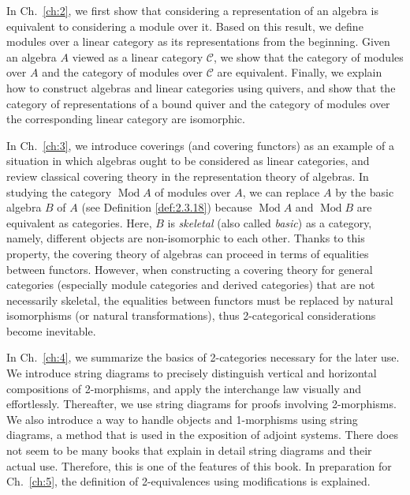 \documentclass{surv-l}
\numberwithin{equation}{chapter}
\numberwithin{figure}{chapter}
\theoremstyle{plain}
\theoremstyle{definition}
\theoremstyle{remark}
\DeclareMathOperator{\Mod}{Mod}
\begin{document}
In Ch.\ \ref{ch:2}, we first show that considering a representation of an algebra is equivalent to considering a module over it.
Based on this result, we define modules over a linear category as its representations from the beginning.
Given an algebra $A$ viewed as a linear category ${\mathcal{C}}$,
we show that the category of modules over $A$ and the category of modules over ${\mathcal{C}}$ are equivalent.
Finally, we explain how to construct algebras and linear categories using quivers, and show that the category of representations of a bound quiver and the category of modules
over the corresponding linear category are isomorphic.

In Ch.\  \ref{ch:3}, we introduce coverings (and covering functors)
as an example of a situation in which algebras ought to be considered as linear categories, and review classical covering theory in the representation theory of algebras.
In studying the category $\Mod A$ of modules over $A$,
we can replace $A$ by the basic algebra $B$ of $A$ (see Definition \ref{def:2.3.18})
because $\Mod A$ and $\Mod B$ are equivalent as categories.
Here, $B$ is {\em skeletal} (also called {\em basic}) as a category, namely,
different objects are non-isomorphic to each other.
Thanks to this property, the covering theory of algebras can proceed in terms of equalities between functors.
However, when constructing a covering theory for general categories (especially module categories and derived categories) that are not necessarily skeletal, the equalities between functors must be replaced by natural isomorphisms (or natural transformations),
thus 2-categorical considerations become inevitable.

In Ch.\  \ref{ch:4}, we summarize the basics of 2-categories necessary for the later use.
We introduce string diagrams to precisely distinguish vertical and horizontal compositions of 2-morphisms, and apply the interchange law visually and effortlessly.
Thereafter, we use string diagrams for proofs involving 2-morphisms.
We also introduce a way to handle objects and 1-morphisms using string diagrams, a method that is used in the exposition of adjoint systems.
There does not seem to be many books that explain in detail string diagrams and their actual use.  Therefore, this is one of the features of this book.
In preparation for Ch.\ \ref{ch:5}, the definition of 2-equivalences using modifications is explained.
\end{document}
